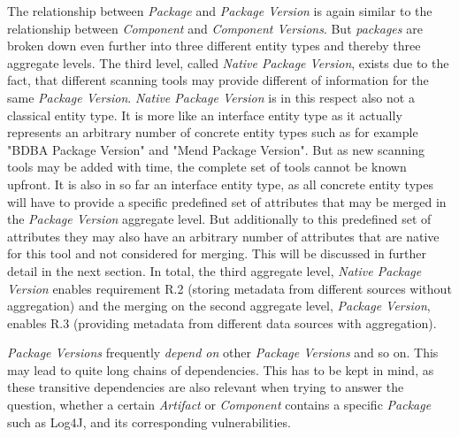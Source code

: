 The relationship between \emph{Package} and \emph{Package Version} is again similar to the relationship between \emph{Component} and \emph{Component Versions}. But \emph{packages} are broken down even further into three different entity types and thereby three aggregate levels. The third level, called \emph{Native Package Version}, exists due to the fact, that different scanning tools may provide different of information for the same \emph{Package Version}. \emph{Native Package Version} is in this respect also not a classical entity type. It is more like an interface entity type as it actually represents an arbitrary number of concrete entity types such as for example "BDBA Package Version" and "Mend Package Version". But as new scanning tools may be added with time, the complete set of tools cannot be known upfront. It is also in so far an interface entity type, as all concrete entity types will have to provide a specific predefined set of attributes that may be merged in the \emph{Package Version} aggregate level. But additionally to this predefined set of attributes they may also have an arbitrary number of attributes that are native for this tool and not considered for merging. This will be discussed in further detail in the next section. In total, the third aggregate level, \emph{Native Package Version} enables requirement R.2 (storing metadata from different sources without aggregation) and the merging on the second aggregate level, \emph{Package Version}, enables R.3 (providing metadata from different data sources with aggregation).\par
\emph{Package Versions} frequently \emph{depend on} other \emph{Package Versions} and so on. This may lead to quite long chains of dependencies. This has to be kept in mind, as these transitive dependencies are also relevant when trying to answer the question, whether a certain \emph{Artifact} or \emph{Component} contains a specific \emph{Package} such as Log4J, and its corresponding vulnerabilities.\par
